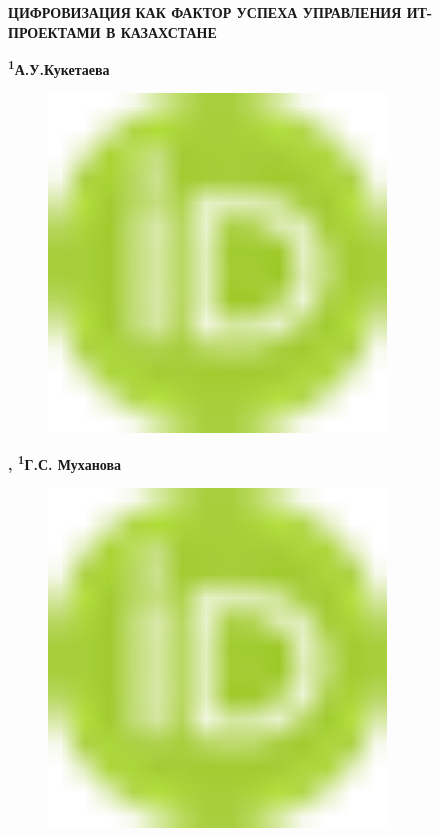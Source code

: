 
{\bfseries ЦИФРОВИЗАЦИЯ} {\bfseries КАК ФАКТОР УСПЕХА УПРАВЛЕНИЯ ИТ-ПРОЕКТАМИ
В КАЗАХСТАНЕ}

{\bfseries \textsuperscript{1}А.У.Кукетаева}
\begin{figure}[H]
	\centering
	\includegraphics[width=0.8\textwidth]{media/ekon2/image1}
	\caption*{}
\end{figure}
{\bfseries \textsuperscript{\envelope },
\textsuperscript{1}Г.С.
Муханова}
\begin{figure}[H]
	\centering
	\includegraphics[width=0.8\textwidth]{media/ekon2/image1}
	\caption*{}
\end{figure}
